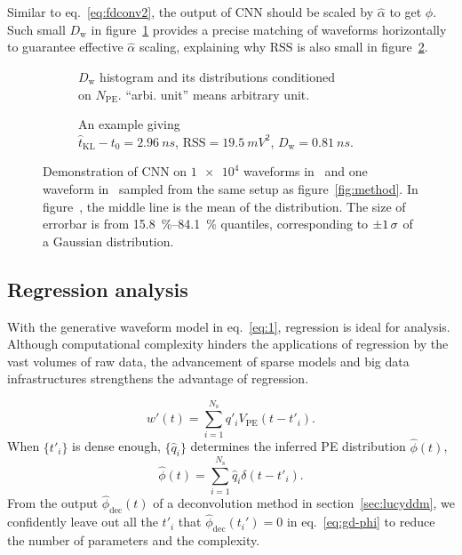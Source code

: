 Similar to eq.~\eqref{eq:fdconv2}, the output of CNN should be scaled by $\hat{\alpha}$ to get $\hat{\phi}$. Such small $D_\mathrm{w}$ in figure~\ref{fig:cnn-npe} provides a precise matching of waveforms horizontally to guarantee effective $\hat{\alpha}$ scaling, explaining why $\mathrm{RSS}$ is also small in figure~\ref{fig:cnn}.

\begin{figure}[H]
  \begin{subfigure}{.5\textwidth}
    \centering
    \resizebox{\textwidth}{!}{}
    \caption{\label{fig:cnn-npe} $D_\mathrm{w}$ histogram and its distributions conditioned \\ on $N_{\mathrm{PE}}$. ``arbi. unit'' means arbitrary unit.}
  \end{subfigure}
  \begin{subfigure}{.5\textwidth}
    \centering
    \resizebox{\textwidth}{!}{}
    \caption{\label{fig:cnn}An example giving \\ $\hat{t}_\mathrm{KL} - t_0=\SI{2.96}{ns}$, $\mathrm{RSS}=\SI{19.5}{mV^2}$, $D_\mathrm{w}=\SI{0.81}{ns}$.}
  \end{subfigure}
  \caption{\label{fig:cnn-performance}Demonstration of CNN on $\num[retain-unity-mantissa=false]{1e4}$ waveforms in~ and one waveform in~ sampled from the same setup as figure~\ref{fig:method}. In figure~, the middle line is the mean of the distribution. The size of errorbar is from \SIrange{15.8}{84.1}{\percent} quantiles, corresponding to $\SI{\pm 1}{\sigma}$ of a Gaussian distribution. }
\end{figure}

\subsection{Regression analysis}
\label{sec:regression}
With the generative waveform model in eq.~\eqref{eq:1}, regression is ideal for analysis. Although computational complexity hinders the applications of regression by the vast volumes of raw data, the advancement of sparse models and big data infrastructures strengthens the advantage of regression.

\begin{equation}
  \label{eq:gd}
  w'(t) = \sum_{i=1}^{N_\mathrm{s}}q'_iV_\mathrm{PE}(t-t'_i).
\end{equation}
When $\{t'_i\}$ is dense enough, $\{\hat{q}_i\}$ determines the inferred PE distribution $\hat{\phi}(t)$,
\begin{equation}
  \label{eq:gd-phi}
  \hat{\phi}(t) = \sum_{i=1}^{N_\mathrm{s}}\hat{q}_i\delta(t-t'_i).
\end{equation}
From the output $\hat{\phi}_\mathrm{dec}(t)$ of a deconvolution method in section~\ref{sec:lucyddm}, we confidently leave out all the $t'_i$ that $\hat{\phi}_\mathrm{dec}(t_i')=0$ in eq.~\eqref{eq:gd-phi} to reduce the number of parameters and the complexity.


